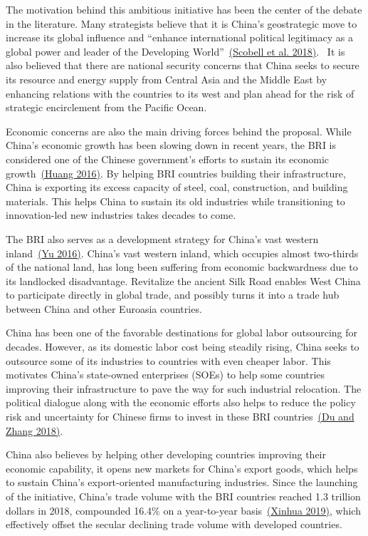 \documentclass[10pt,a4paper]{article}
\begin{document}
The motivation behind this ambitious initiative has been the center of
the debate in the literature. Many strategists believe that it is
China's geostrategic move to increase its global influence and ``enhance
international political legitimacy as a global power and leader of the
Developing World''~\hyperref[csl:5]{(Scobell et al. 2018)}.~ It is also believed that there
are national security concerns that China seeks to secure its resource
and energy supply from Central Asia and the Middle East by enhancing
relations with the countries to its west and plan ahead for the risk of
strategic encirclement from the Pacific Ocean.~

Economic concerns are also the main driving forces behind the proposal.
While China's economic growth has been slowing down in recent years, the
BRI is considered one of the Chinese government's efforts to sustain its
economic growth~\hyperref[csl:6]{(Huang 2016)}. By helping BRI countries building
their infrastructure, China is exporting its excess capacity of steel,
coal, construction, and building materials. This helps China to sustain
its old industries while transitioning to innovation-led new industries
takes decades to come.

The BRI also serves as a development strategy for China's vast western
inland~\hyperref[csl:7]{(Yu 2016)}. China's vast western inland, which occupies
almost two-thirds of the national land, has long been suffering from
economic backwardness due to its landlocked disadvantage. Revitalize the
ancient Silk Road enables West China to participate directly in global
trade, and possibly turns it into a trade hub between China and other
Euroasia countries.

China has been one of the favorable destinations for global labor
outsourcing for decades. However, as its domestic labor cost being
steadily rising, China seeks to outsource some of its industries to
countries with even cheaper labor. This motivates China's state-owned
enterprises (SOEs) to help some countries improving their infrastructure
to pave the way for such industrial relocation. The political dialogue
along with the economic efforts also helps to reduce the policy risk and
uncertainty for Chinese firms to invest in these BRI
countries~\hyperref[csl:8]{(Du and Zhang 2018)}.~~

China also believes by helping other developing countries improving
their economic capability, it opens new markets for China's export
goods, which helps to sustain China's export-oriented manufacturing
industries. Since the launching of the initiative, China's trade volume
with the BRI countries reached 1.3 trillion dollars in 2018, compounded
16.4\% on a year-to-year basis~\hyperref[csl:4]{(Xinhua 2019)}, which effectively
offset the secular declining trade volume with developed countries.~
\end{document}

